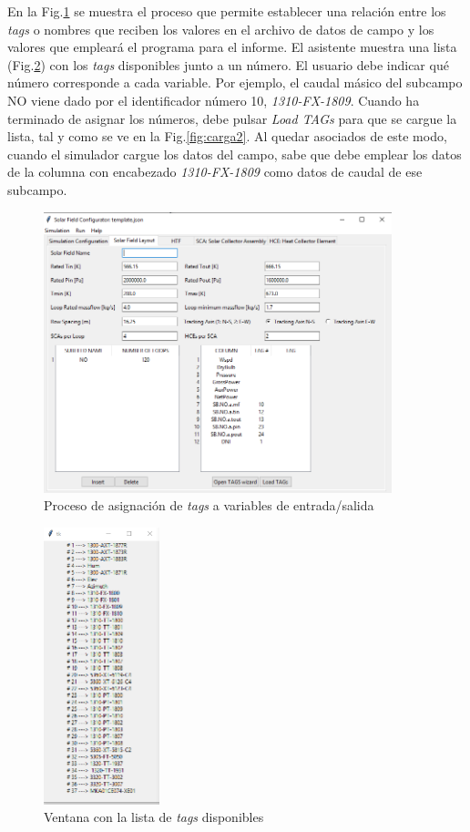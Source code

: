 En la Fig.\ref{fig:carga1} se muestra el proceso que permite establecer una relación entre los \emph{tags} o nombres que reciben los valores en el archivo de datos de campo y los valores que empleará el programa para el informe. El asistente muestra una lista (Fig.\ref{fig:listatags}) con los \emph{tags} disponibles junto a un número. El usuario debe indicar qué número corresponde a cada variable. Por ejemplo, el caudal másico del subcampo NO viene dado por el identificador número 10, \emph{1310-FX-1809}. Cuando ha terminado de asignar los números, debe pulsar \emph{Load TAGs} para que se cargue la lista, tal y como se ve en la Fig.\ref{fig:carga2}. Al quedar asociados de este modo, cuando el simulador cargue los datos del campo, sabe que debe emplear los datos de la columna con encabezado \emph{1310-FX-1809} como datos de caudal de ese subcampo.

\begin{figure}[H]
\includegraphics[width=0.9\textwidth, height=0.7\textwidth]{images/carga_tags.png}
\caption{Proceso de asignación de \emph{tags} a variables de entrada/salida}
\label{fig:carga1}
\end{figure}

\begin{figure}[H]
\includegraphics[width=0.3\textwidth, height=0.5\textwidth]{images/tagslist.png}
\caption{Ventana con la lista de \emph{tags} disponibles}
\label{fig:listatags}
\end{figure}

